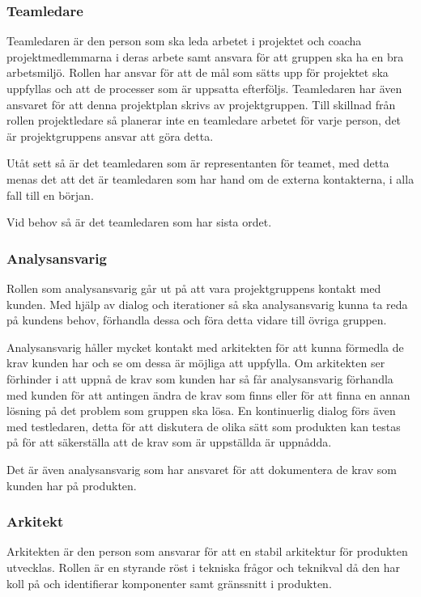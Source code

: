 \documentclass[a4paper,10pt]{article}
\begin{document}
\subsubsection{Teamledare}
Teamledaren är den person som ska leda arbetet i projektet och coacha projektmedlemmarna i deras arbete samt ansvara för att gruppen ska ha en bra arbetsmiljö. Rollen har ansvar för att de mål som sätts upp för projektet ska uppfyllas och att de processer som är uppsatta efterföljs. Teamledaren har även ansvaret för att denna projektplan skrivs av projektgruppen. Till skillnad från rollen projektledare så planerar inte en teamledare arbetet för varje person, det är projektgruppens ansvar att göra detta.

Utåt sett så är det teamledaren som är representanten för teamet, med detta menas det att det är teamledaren som har hand om de externa kontakterna, i alla fall till en början.

Vid behov så är det teamledaren som har sista ordet.
\subsubsection{Analysansvarig}
Rollen som analysansvarig går ut på att vara projektgruppens kontakt med kunden. Med hjälp av dialog och iterationer så ska analysansvarig kunna ta reda på kundens behov, förhandla dessa och föra detta vidare till övriga gruppen.

Analysansvarig håller mycket kontakt med arkitekten för att kunna förmedla de krav kunden har och se om dessa är möjliga att uppfylla. Om arkitekten ser förhinder i att uppnå de krav som kunden har så får analysansvarig förhandla med kunden för att antingen ändra de krav som finns eller för att finna en annan lösning på det problem som gruppen ska lösa.
En kontinuerlig dialog förs även med testledaren, detta för att diskutera de olika sätt som produkten kan testas på för att säkerställa att de krav som är uppställda är uppnådda.

Det är även analysansvarig som har ansvaret för att dokumentera de krav som kunden har på produkten.
\subsubsection{Arkitekt}
Arkitekten är den person som ansvarar för att en stabil arkitektur för produkten utvecklas. Rollen är en styrande röst i tekniska frågor och teknikval då den har koll på och identifierar komponenter samt gränssnitt i produkten.
\end{document}

